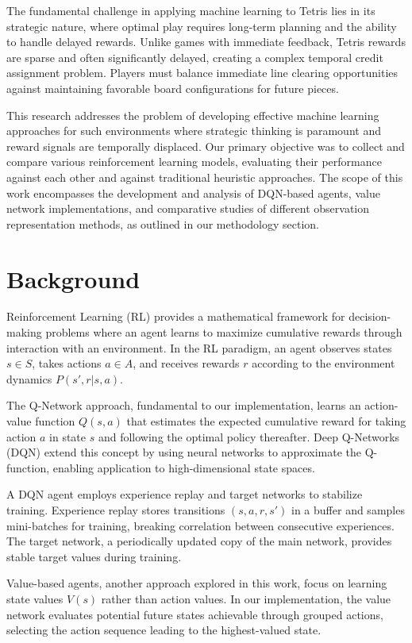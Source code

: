 \documentclass[conference]{IEEEtran}
\begin{document}
The fundamental challenge in applying machine learning to Tetris lies in its strategic nature, where optimal play requires long-term planning and the ability to handle delayed rewards. Unlike games with immediate feedback, Tetris rewards are sparse and often significantly delayed, creating a complex temporal credit assignment problem. Players must balance immediate line clearing opportunities against maintaining favorable board configurations for future pieces.

This research addresses the problem of developing effective machine learning approaches for such environments where strategic thinking is paramount and reward signals are temporally displaced. Our primary objective was to collect and compare various reinforcement learning models, evaluating their performance against each other and against traditional heuristic approaches. The scope of this work encompasses the development and analysis of DQN-based agents, value network implementations, and comparative studies of different observation representation methods, as outlined in our methodology section.

\section{Background}

Reinforcement Learning (RL) provides a mathematical framework for decision-making problems where an agent learns to maximize cumulative rewards through interaction with an environment. In the RL paradigm, an agent observes states $s \in S$, takes actions $a \in A$, and receives rewards $r$ according to the environment dynamics $P(s',r|s,a)$.

The Q-Network approach, fundamental to our implementation, learns an action-value function $Q(s,a)$ that estimates the expected cumulative reward for taking action $a$ in state $s$ and following the optimal policy thereafter. Deep Q-Networks (DQN) extend this concept by using neural networks to approximate the Q-function, enabling application to high-dimensional state spaces.

A DQN agent employs experience replay and target networks to stabilize training. Experience replay stores transitions $(s,a,r,s')$ in a buffer and samples mini-batches for training, breaking correlation between consecutive experiences. The target network, a periodically updated copy of the main network, provides stable target values during training.

Value-based agents, another approach explored in this work, focus on learning state values $V(s)$ rather than action values. In our implementation, the value network evaluates potential future states achievable through grouped actions, selecting the action sequence leading to the highest-valued state.
\end{document}
